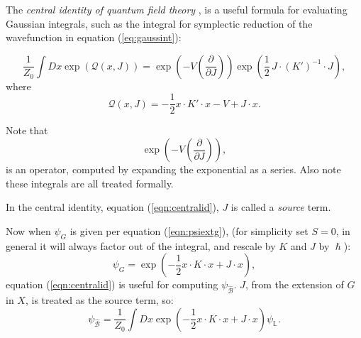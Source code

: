     
    The \emph{central identity of quantum field theory} \cite{zee}, is a useful formula for evaluating Gaussian integrals, such as the integral for symplectic reduction of the wavefunction in equation (\ref{eq:gaussint}):
    \begin{lem}
        \begin{equation} 
        \label{eqn:centralid}
        \frac{1}{Z_0}\int Dx \exp \left( \mathcal{Q}(x, J) \right) 
        = \exp\left(-V\left(\frac{\partial}{\partial J}\right)\right) \exp\left( \frac12 \, J \cdot (K')^{-1} \cdot J\right), 
    \end{equation}
    where 
    \[ \mathcal{Q}(x,J) = -\frac{1}{2} x \cdot K' \cdot x - V + J \cdot x.\]
    \end{lem} 
    Note that 
    \[\exp\left(-V\left(\frac{\partial}{\partial J}\right)\right),\] 
    is an operator, computed by expanding the exponential as a series. Also note these integrals are all treated formally. 
    \begin{rem}
    In the central identity, equation (\ref{eqn:centralid}), \(J\) is called a \emph{source} term.
    \end{rem}
    
    Now when \( \psi_G\) is given per equation (\ref{eqn:psiextg}), (for simplicity set \(S=0\), in general it will always factor out of the integral, and rescale by \(K\) and \(J\) by \(\hslash\)):
    \[ \psi_G = \exp\left( -\frac{1}{2}  x \cdot K \cdot x + J \cdot x \right),\]
    equation (\ref{eqn:centralid}) is useful for computing \( \psi_{\widehat{\mathcal{B}}}\). \(J\), from the extension of \(G\) in \(X\), is treated as the source term, so:
    \[ \psi_{\widehat{\mathcal{B}}} = \frac{1}{Z_0} \int Dx \exp\left( -\frac{1}{2}  x\cdot K \cdot x + J \cdot x \right) \psi_{\mathbb{L}}. \]

    
    
    
    
    
